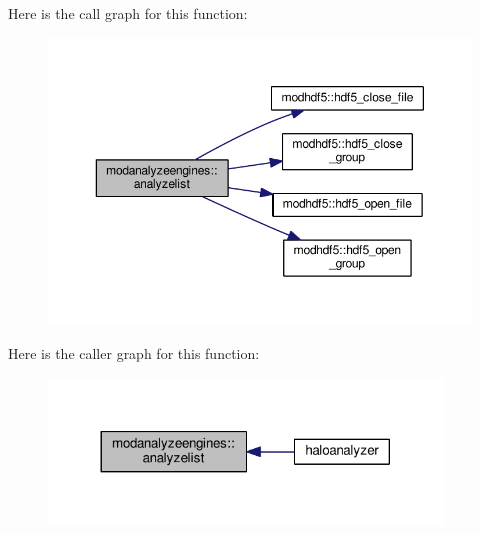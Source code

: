 Here is the call graph for this function\+:\nopagebreak
\begin{figure}[H]
\begin{center}
\leavevmode
\includegraphics[width=350pt]{namespacemodanalyzeengines_a8b4129514638c5b686e9e48dfd32fdff_cgraph}
\end{center}
\end{figure}




Here is the caller graph for this function\+:\nopagebreak
\begin{figure}[H]
\begin{center}
\leavevmode
\includegraphics[width=296pt]{namespacemodanalyzeengines_a8b4129514638c5b686e9e48dfd32fdff_icgraph}
\end{center}
\end{figure}


